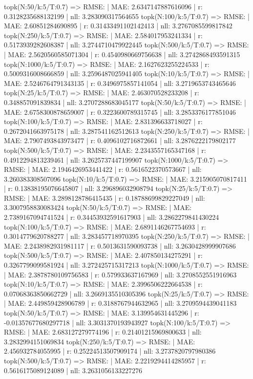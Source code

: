 topk(N:50/k:5/T:0.7) => RMSE: | MAE: 2.6347147887616096 | r: 0.3128235688132199 | nll: 3.283090317564655
topk(N:100/k:5/T:0.7) => RMSE: | MAE: 2.60851284690895 | r: 0.31433491102142413 | nll: 3.2767085599817842
topk(N:250/k:5/T:0.7) => RMSE: | MAE: 2.584017953241334 | r: 0.5173939282608387 | nll: 3.2744710479922445
topk(N:500/k:5/T:0.7) => RMSE: | MAE: 2.5620560585071304 | r: 0.4540980669756638 | nll: 3.2742868493591315
topk(N:1000/k:5/T:0.7) => RMSE: | MAE: 2.1627623255224533 | r: 0.5009316008666859 | nll: 3.2596487025941405
topk(N:10/k:5/T:0.7) => RMSE: | MAE: 2.5246764791343135 | r: 0.3496975857141054 | nll: 3.2719653743465646
topk(N:25/k:5/T:0.7) => RMSE: | MAE: 2.463070528233208 | r: 0.348857091839834 | nll: 3.2707288683045177
topk(N:50/k:5/T:0.7) => RMSE: | MAE: 2.6758300878659007 | r: 0.3223600789315745 | nll: 3.2853376177851046
topk(N:100/k:5/T:0.7) => RMSE: | MAE: 2.831396633718027 | r: 0.2672041663975178 | nll: 3.287541162512613
topk(N:250/k:5/T:0.7) => RMSE: | MAE: 2.7907493843973477 | r: 0.4096102716872661 | nll: 3.2876222179802177
topk(N:500/k:5/T:0.7) => RMSE: | MAE: 2.2343557165347168 | r: 0.4912294813239461 | nll: 3.2625737447199907
topk(N:1000/k:5/T:0.7) => RMSE: | MAE: 2.1946426953441422 | r: 0.5616522370573667 | nll: 3.260383308507096
topk(N:10/k:5/T:0.7) => RMSE: | MAE: 3.215905070817411 | r: 0.13838195076645807 | nll: 3.296896032908794
topk(N:25/k:5/T:0.7) => RMSE: | MAE: 3.2898128786415435 | r: 0.18788699829227049 | nll: 3.3007958830083424
topk(N:50/k:5/T:0.7) => RMSE: | MAE: 2.7389167094741524 | r: 0.34453932591617903 | nll: 3.2862279841430224
topk(N:100/k:5/T:0.7) => RMSE: | MAE: 2.6891146267754693 | r: 0.3014779620788277 | nll: 3.283457718970395
topk(N:250/k:5/T:0.7) => RMSE: | MAE: 2.2438982931981117 | r: 0.5013631590093738 | nll: 3.2630428999907686
topk(N:500/k:5/T:0.7) => RMSE: | MAE: 2.407850134275291 | r: 0.3267799099581924 | nll: 3.272425715317213
topk(N:1000/k:5/T:0.7) => RMSE: | MAE: 2.3878780109756583 | r: 0.579933637167969 | nll: 3.2708552551916963
topk(N:10/k:5/T:0.7) => RMSE: | MAE: 2.3996506222664538 | r: 0.07068363850662729 | nll: 3.2669135510305396
topk(N:25/k:5/T:0.7) => RMSE: | MAE: 2.449859428906789 | r: 0.3188767944632965 | nll: 3.2709594439041183
topk(N:50/k:5/T:0.7) => RMSE: | MAE: 3.139954631445296 | r: -0.01357677680297718 | nll: 3.3031370193943927
topk(N:100/k:5/T:0.7) => RMSE: | MAE: 2.683127279774196 | r: 0.21401215969800633 | nll: 3.2832994151069834
topk(N:250/k:5/T:0.7) => RMSE: | MAE: 2.456932784055995 | r: 0.25224513507909174 | nll: 3.2737820797980386
topk(N:500/k:5/T:0.7) => RMSE: | MAE: 2.2219294414285957 | r: 0.5616175089124089 | nll: 3.2631056133227276
